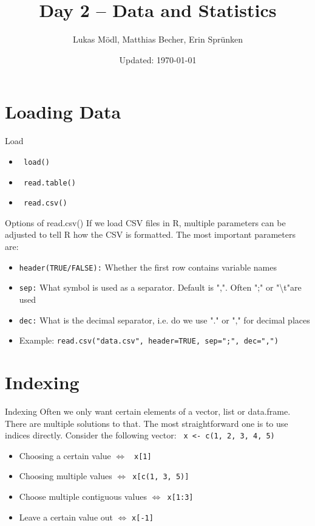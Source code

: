 \documentclass[aspectratio = 169]{chariteBeamer}
\author[L. Mödl, M. Becher, E. Sprünken]{Lukas Mödl, Matthias Becher, Erin Sprünken}
\title{Day 2 -- Data and Statistics}
\date[]{Updated: \today}
\begin{document}
\begin{frame}[plain]
    \titlepage%
\end{frame}
\frame{\tableofcontents}



\section{Loading Data}
\begin{frame}[fragile]{Load}
  \begin{itemize}
	  \item \verb+ load() +
	  \item  \verb+ read.table() +
	  \item  \verb+ read.csv() +
  \end{itemize}
\end{frame}

\begin{frame}[fragile]{Options of read.csv()}
If we load CSV files in R, multiple parameters can be adjusted to tell R how the CSV is formatted. The most important parameters are:
  \begin{itemize}
	  \item \verb+header(TRUE/FALSE):+ Whether the first row contains variable names
	  \item \verb+sep:+ What symbol is used as a separator. Default is ",". Often ";" or "\textbackslash t"are used
	  \item \verb+dec:+ What is the decimal separator, i.e. do we use "." or "," for decimal places
	  \item	Example: \verb+read.csv("data.csv", header=TRUE, sep=";", dec=",")+
  \end{itemize}
\end{frame}

\section{Indexing}
\begin{frame}[fragile]{Indexing}
	Often we only want certain elements of a vector, list or data.frame. There are multiple solutions to that. The most straightforward one is to use indices directly. Consider the following vector: \verb+ x <- c(1, 2, 3, 4, 5) +
	\begin{itemize}
		\item Choosing a certain value $\Leftrightarrow$ \verb+ x[1]+
		\item  Choosing multiple values $\Leftrightarrow$\verb+ x[c(1, 3, 5)]+
		\item  Choose multiple contiguous values $\Leftrightarrow$\verb+ x[1:3]+
		\item  Leave a certain value out $\Leftrightarrow$ \verb+x[-1]+
	\end{itemize}
\end{frame}
\end{document}

